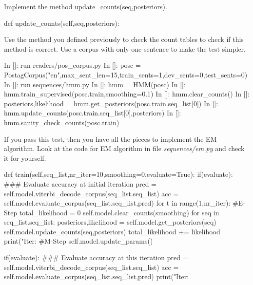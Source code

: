 \begin{exercise}

Implement the method update\_counts(seq,posteriors).
\begin{python}
 def update_counts(self,seq,posteriors):
\end{python}

Use the method you defined previously to check the count tables to
check if this method is correct. Use a corpus with only one sentence
to make the test simpler.

\begin{python}
In []: run readers/pos_corpus.py
In []: posc = PostagCorpus("en",max_sent_len=15,train_sents=1,dev_sents=0,test_sents=0)
In []: run sequences/hmm.py
In []: hmm = HMM(posc)
In []: hmm.train_supervised(posc.train,smoothing=0.1)
In []: hmm.clear_counts()
In []: posteriors,likelihood = hmm.get_posteriors(posc.train.seq_list[0])
In []: hmm.update_counts(posc.train.seq_list[0],posteriors)
In []: hmm.sanity_check_counts(posc.train)
\end{python}

If you pass this test, then you have all the pieces to implement the
EM algorithm. Look at the code for EM algorithm in file
\emph{sequences/em.py} and check it for yourself. 

\begin{python}
    def train(self,seq_list,nr_iter=10,smoothing=0,evaluate=True):
        if(evaluate):
            ### Evaluate accuracy at initial iteration
            pred = self.model.viterbi_decode_corpus(seq_list.seq_list)
            acc = self.model.evaluate_corpus(seq_list.seq_list,pred)
        for t in range(1,nr_iter):
            #E-Step
            total_likelihood = 0
            self.model.clear_counts(smoothing)
            for seq in seq_list.seq_list:
                posteriors,likelihood = self.model.get_posteriors(seq)
                self.model.update_counts(seq,posteriors)
                total_likelihood += likelihood
            print("Iter: %
            #M-Step
            self.model.update_params()

            if(evaluate):
                 ### Evaluate accuracy at this iteration
                pred = self.model.viterbi_decode_corpus(seq_list.seq_list)
                acc = self.model.evaluate_corpus(seq_list.seq_list,pred)
                print("Iter: %
\end{python}

\end{exercise}

